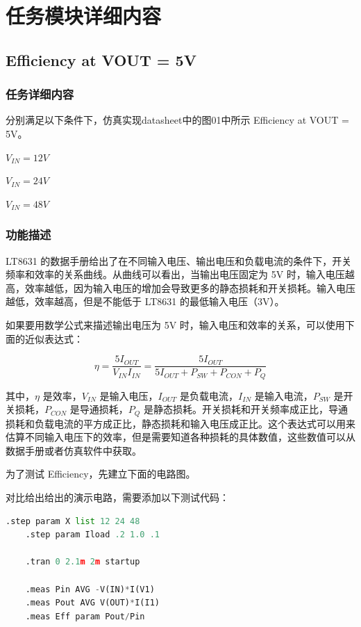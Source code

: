 \documentclass[lang=cn,10pt]{elegantbook}
\begin{document}
\chapter{任务模块详细内容}

\section{Efficiency at VOUT = 5V}

\subsection{任务详细内容}

分别满足以下条件下，仿真实现datasheet中的图01中所示 Efficiency at VOUT = 5V。

$V_{IN} = 12V$

$V_{IN} = 24V$

$V_{IN} = 48V$

\subsection{功能描述}

LT8631 的数据手册给出了在不同输入电压、输出电压和负载电流的条件下，开关频率和效率的关系曲线。从曲线可以看出，当输出电压固定为 5V 时，输入电压越高，效率越低，因为输入电压的增加会导致更多的静态损耗和开关损耗。输入电压越低，效率越高，但是不能低于 LT8631 的最低输入电压（3V）。

如果要用数学公式来描述输出电压为 5V 时，输入电压和效率的关系，可以使用下面的近似表达式：

$$\eta = \frac{5I_{OUT}}{V_{IN}I_{IN}} = \frac{5I_{OUT}}{5I_{OUT} + P_{SW} + P_{CON} + P_{Q}}$$

其中，$\eta$ 是效率，$V_{IN}$ 是输入电压，$I_{OUT}$ 是负载电流，$I_{IN}$ 是输入电流，$P_{SW}$ 是开关损耗，$P_{CON}$ 是导通损耗，$P_{Q}$ 是静态损耗。开关损耗和开关频率成正比，导通损耗和负载电流的平方成正比，静态损耗和输入电压成正比。这个表达式可以用来估算不同输入电压下的效率，但是需要知道各种损耗的具体数值，这些数值可以从数据手册或者仿真软件中获取。

为了测试 Efficiency，先建立下面的电路图。

对比给出给出的演示电路，需要添加以下测试代码：

\begin{lstlisting}[language=Python, caption=G01]
    .step param X list 12 24 48
    .step param Iload .2 1.0 .1

    .tran 0 2.1m 2m startup

    .meas Pin AVG -V(IN)*I(V1)
    .meas Pout AVG V(OUT)*I(I1)
    .meas Eff param Pout/Pin
\end{lstlisting}
\end{document}
